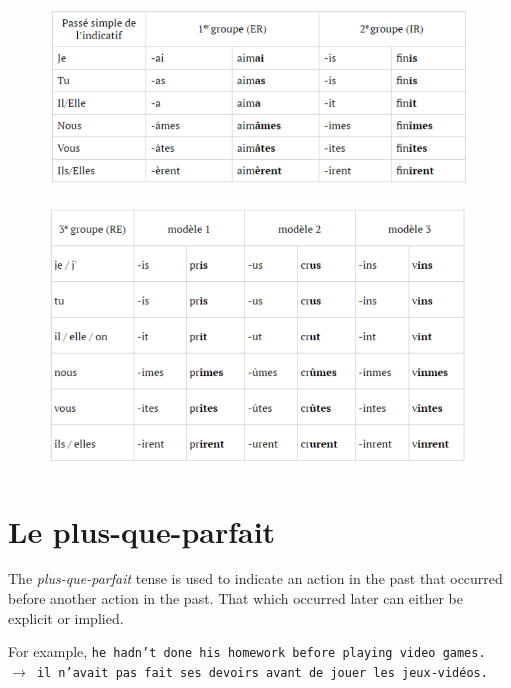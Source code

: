 \documentclass[11pt, oneside]{book}
\begin{document}
{{\begin{figure}[H]
	\includegraphics[scale=0.6]{charts/passeSimple1.png}
\end{figure} \vspace{0.5\baselineskip} 
\begin{figure}[H]
	\includegraphics[scale=0.6]{charts/passeSimple2.png}
\end{figure} \vspace{0.5\baselineskip} 


\section{Le plus-que-parfait}

The \textit{plus-que-parfait} tense is used to indicate an action in the past that occurred before another action in the past. That which occurred later can either be explicit or implied. \vspace{0.5\baselineskip} 

For example, \texttt{he hadn't done his homework before playing video games. $\rightarrow$ il n'avait pas fait ses devoirs avant de jouer les jeux-vid\'eos.} \vspace{0.5\baselineskip} 

}}
\end{document}
